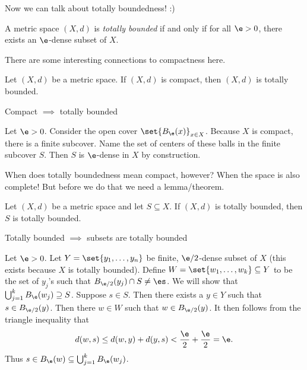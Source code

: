 \documentclass[class=article, crop=false]{standalone}
\begin{document}
Now we can talk about totally boundedness! :)

\begin{defn}
    A metric space $(X,d)$ is \textit{totally bounded} if and only if for all $\e > 0$, there exists an $\e$-dense subset of $X$.
\end{defn}

There are some interesting connections to compactness here.
\begin{thm}
    Let $(X,d)$ be a metric space. If $(X,d)$ is compact, then $(X,d)$ is totally bounded.
\end{thm}
\begin{slogan}
    Compact $\implies$ totally bounded
\end{slogan}
\begin{pf}
    Let $\e > 0$. Consider the open cover $\set{B_\e(x)}_{x \in X}$. Because $X$ is compact, there is a finite subcover. Name the set of centers of these balls in the finite subcover $S$. Then $S$ is $\e$-dense in $X$ by construction.
\end{pf}

When does totally boundedness mean compact, however? When the space is also complete! But before we do that we need a lemma/theorem.
\begin{lem}{\label{lem:totboundsubsets}}
    Let $(X,d)$ be a metric space and let $S \subseteq X$. If $(X,d)$ is totally bounded, then $S$ is totally bounded.
\end{lem}
\begin{slogan}
    Totally bounded $\implies$ subsets are totally bounded
\end{slogan}
\begin{pf}
    Let $\e > 0$. Let $Y = \set{y_1, \ldots, y_n}$ be finite, $\e/2$-dense subset of $X$ (this exists because $X$ is totally bounded). Define $W = \set{w_1, \ldots, w_k} \subseteq Y$ to be the set of $y_j$'s such that $B_{\e/2}(y_j) \cap S \neq \es$. We will show that $ \bigcup_{j=1}^{k} B_\e(w_j) \supseteq S$. Suppose
    $s \in S$. Then there exists a $y \in Y$ such that $s \in B_{\e/2}(y)$. Then there $w \in W$ such that $w \in B_{\e/2}(y)$. It then follows from the triangle inequality that
    \[
        d(w,s) \leq d(w,y) + d(y,s) < \frac{\e}{2} + \frac{\e}{2} = \e.
    \]
    Thus $s \in B_{\e}(w) \subseteq  \bigcup_{j=1}^{k} B_\e(w_j)$.
\end{pf}
\end{document}

